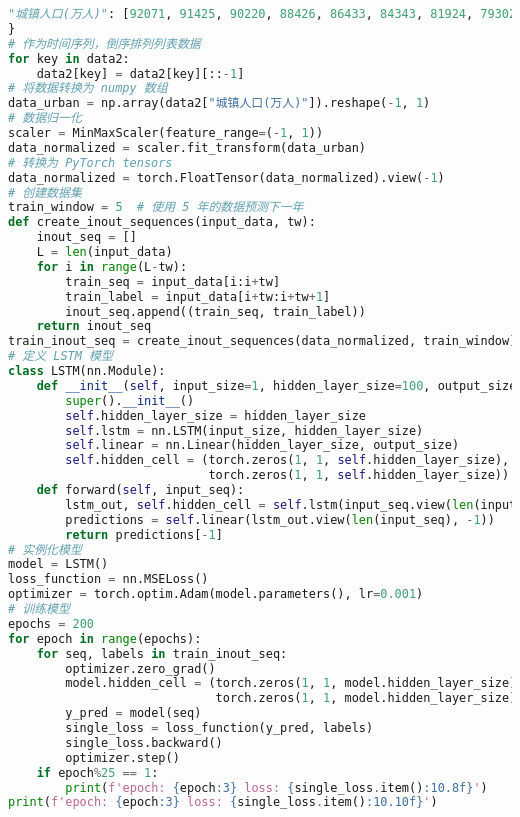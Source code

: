 \begin{lstlisting}[language=python,caption={城乡人口}]
    "城镇人口(万人)": [92071, 91425, 90220, 88426, 86433, 84343, 81924, 79302, 76738, 74502, 72175, 69927, 66978, 64512, 62403, 60633, 58288, 56212, 54283, 52376, 50212, 48064, 45906, 43748, 41608, 39449, 37304, 35174, 34169, 33173, 32175, 31203, 30195],
}
# 作为时间序列，倒序排列列表数据
for key in data2:
    data2[key] = data2[key][::-1]
# 将数据转换为 numpy 数组
data_urban = np.array(data2["城镇人口(万人)"]).reshape(-1, 1)
# 数据归一化
scaler = MinMaxScaler(feature_range=(-1, 1))
data_normalized = scaler.fit_transform(data_urban)
# 转换为 PyTorch tensors
data_normalized = torch.FloatTensor(data_normalized).view(-1)
# 创建数据集
train_window = 5  # 使用 5 年的数据预测下一年
def create_inout_sequences(input_data, tw):
    inout_seq = []
    L = len(input_data)
    for i in range(L-tw):
        train_seq = input_data[i:i+tw]
        train_label = input_data[i+tw:i+tw+1]
        inout_seq.append((train_seq, train_label))
    return inout_seq
train_inout_seq = create_inout_sequences(data_normalized, train_window)
# 定义 LSTM 模型
class LSTM(nn.Module):
    def __init__(self, input_size=1, hidden_layer_size=100, output_size=1):
        super().__init__()
        self.hidden_layer_size = hidden_layer_size
        self.lstm = nn.LSTM(input_size, hidden_layer_size)
        self.linear = nn.Linear(hidden_layer_size, output_size)
        self.hidden_cell = (torch.zeros(1, 1, self.hidden_layer_size),
                            torch.zeros(1, 1, self.hidden_layer_size))
    def forward(self, input_seq):
        lstm_out, self.hidden_cell = self.lstm(input_seq.view(len(input_seq), 1, -1), self.hidden_cell)
        predictions = self.linear(lstm_out.view(len(input_seq), -1))
        return predictions[-1]
# 实例化模型
model = LSTM()
loss_function = nn.MSELoss()
optimizer = torch.optim.Adam(model.parameters(), lr=0.001)
# 训练模型
epochs = 200
for epoch in range(epochs):
    for seq, labels in train_inout_seq:
        optimizer.zero_grad()
        model.hidden_cell = (torch.zeros(1, 1, model.hidden_layer_size),
                             torch.zeros(1, 1, model.hidden_layer_size))
        y_pred = model(seq)
        single_loss = loss_function(y_pred, labels)
        single_loss.backward()
        optimizer.step()
    if epoch%25 == 1:
        print(f'epoch: {epoch:3} loss: {single_loss.item():10.8f}')
print(f'epoch: {epoch:3} loss: {single_loss.item():10.10f}')


\end{lstlisting}
